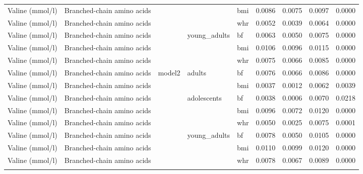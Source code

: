 \documentclass[11pt,twoside]{bristolthesis}
\begin{document}
\begin{longtable}[t]{lllllrrrr}
\cmidrule{1-2}
\cmidrule{4-9}\nopagebreak
Valine (mmol/l) & Branched-chain amino acids &  &  & bmi & 0.0086 & 0.0075 & 0.0097 & 0.0000\\
\cmidrule{1-2}
\cmidrule{5-9}\nopagebreak
Valine (mmol/l) & Branched-chain amino acids &  &  & whr & 0.0052 & 0.0039 & 0.0064 & 0.0000\\
\cmidrule{1-2}
\cmidrule{5-9}\nopagebreak
Valine (mmol/l) & Branched-chain amino acids &  & \multirow{-3}{*}{\raggedright\arraybackslash young\_adults} & bf & 0.0063 & 0.0050 & 0.0075 & 0.0000\\
\cmidrule{1-2}
\cmidrule{4-9}\nopagebreak
Valine (mmol/l) & Branched-chain amino acids &  &  & bmi & 0.0106 & 0.0096 & 0.0115 & 0.0000\\
\cmidrule{1-2}
\cmidrule{5-9}\nopagebreak
Valine (mmol/l) & Branched-chain amino acids &  &  & whr & 0.0075 & 0.0066 & 0.0085 & 0.0000\\
\cmidrule{1-2}
\cmidrule{5-9}\nopagebreak
Valine (mmol/l) & Branched-chain amino acids & \multirow{-11}{*}{\raggedright\arraybackslash model2} & \multirow{-3}{*}{\raggedright\arraybackslash adults} & bf & 0.0076 & 0.0066 & 0.0086 & 0.0000\\
\cmidrule{1-9}\pagebreak[0]
Valine (mmol/l) & Branched-chain amino acids &  &  & bmi & 0.0037 & 0.0012 & 0.0062 & 0.0039\\
\cmidrule{1-2}
\cmidrule{5-9}\nopagebreak
Valine (mmol/l) & Branched-chain amino acids &  & \multirow{-2}{*}{\raggedright\arraybackslash adolescents} & bf & 0.0038 & 0.0006 & 0.0070 & 0.0218\\
\cmidrule{1-2}
\cmidrule{4-9}\nopagebreak
Valine (mmol/l) & Branched-chain amino acids &  &  & bmi & 0.0096 & 0.0072 & 0.0120 & 0.0000\\
\cmidrule{1-2}
\cmidrule{5-9}\nopagebreak
Valine (mmol/l) & Branched-chain amino acids &  &  & whr & 0.0050 & 0.0025 & 0.0075 & 0.0001\\
\cmidrule{1-2}
\cmidrule{5-9}\nopagebreak
Valine (mmol/l) & Branched-chain amino acids &  & \multirow{-3}{*}{\raggedright\arraybackslash young\_adults} & bf & 0.0078 & 0.0050 & 0.0105 & 0.0000\\
\cmidrule{1-2}
\cmidrule{4-9}\nopagebreak
Valine (mmol/l) & Branched-chain amino acids &  &  & bmi & 0.0110 & 0.0099 & 0.0120 & 0.0000\\
\cmidrule{1-2}
\cmidrule{5-9}\nopagebreak
Valine (mmol/l) & Branched-chain amino acids &  &  & whr & 0.0078 & 0.0067 & 0.0089 & 0.0000\\
\cmidrule{1-2}
\cmidrule{5-9}\nopagebreak

\end{longtable}
\end{document}
